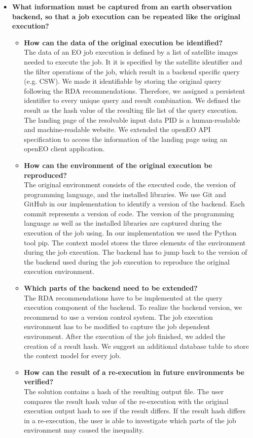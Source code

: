 \documentclass[draft,final]{vutinfth} %
\newcommand{\bgoesswe}[1]{#1}
\newcommand{\bgoessweindel}[1]{{\color{red}#1}}
\begin{document}
\begin{itemize}
	\item \textbf{What information must be captured from an earth observation backend, so that a job execution can be repeated like the original execution?}
	\begin{itemize}
		\item \textbf{How can the data of the original execution be identified?} \\
		\bgoesswe{The data of an EO job execution is defined by a list of satellite images needed to execute the job. It it is specified by the satellite identifier and the filter operations of the job, which result in a backend specific query (e.g. CSW). We made it} identifiable by storing the original query following the RDA recommendations. Therefore, we assigned a persistent identifier to every unique query and result combination. We defined the result as the hash value of the resulting file list of the query execution. The landing page of the resolvable input data PID is a human-readable and machine-readable website. \bgoesswe{We extended the openEO API specification to access the information of the landing page using an openEO client application.}
		\item \textbf{How can the environment of the original execution be reproduced?} \\
		The original environment consists of the \bgoesswe{executed} code, the version of programming language, and the installed libraries. We use Git and GitHub in our implementation to identify a version of the backend. \bgoesswe{Each commit represents a version of code.} \bgoesswe{The version of the programming language as well as the installed libraries are captured during the execution of the job \bgoessweindel{using}. In our implementation we used the Python tool pip. The context model stores the three elements of the environment during the job execution.} The backend has to jump back to the version of the backend used during the job execution to reproduce the original execution environment.       
		\item \textbf{Which parts of the backend need to be extended?} \\
		The RDA recommendations have to be implemented at the query execution component of the backend. To realize the backend version, we recommend to use a version control system. The job execution environment has to be modified to capture the job dependent environment. After the execution of the job finished, we added the creation of a result hash. We suggest an additional database table to store the context model for every job.
		\item \textbf{How can the result of a re-execution in future environments be verified?} \\
		The solution contains a hash of the resulting output file. The user compares the result hash value of the re-execution with the original execution output hash to see if the result differs. \bgoesswe{If the result hash differs in a re-execution, the user is able to investigate which parts of the job environment may caused the inequality.}
	\end{itemize}


\end{itemize}
\end{document}
